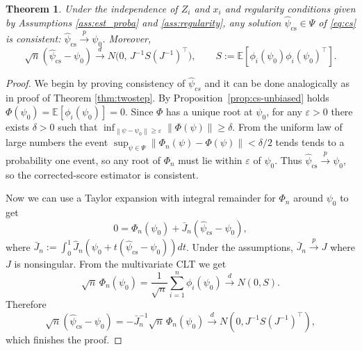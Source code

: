 \documentclass[11pt]{article}
\newtheorem{theorem}{Theorem}
\theoremstyle{definition}
\theoremstyle{remark}
\newcommand{\E}{\mathbb{E}}
\newcommand{\toP}{\xrightarrow{\,p\,}}
\newcommand{\tod}{\xrightarrow{\,d\,}}
\newcommand{\norm}[1]{\left\lVert #1 \right\rVert}
\begin{document}
\begin{theorem}\label{thm:cs}
Under the independence of $Z_i$ and $x_i$ and regularity conditions given by Assumptions  \ref{ass:est_proba} and \ref{ass:regularity}, any solution $\hat\psi_{\mathrm{cs}}\in \Psi$ of \eqref{eq:cs} is consistent: $\hat\psi_{\mathrm{cs}}\toP\psi_0$. Moreover,
\[
\sqrt{n}(\hat\psi_{\mathrm{cs}}-\psi_0)\tod N\big(0,\,J^{-1}S(J^{-1})^\top\big),\qquad S:=\E[\phi_i(\psi_0)\phi_i(\psi_0)^\top].
\]
\end{theorem}

\begin{proof}
We begin by proving consistency of $\hat\psi_{cs}$ and it can be done analogically as in proof of Theorem \ref{thm:twostep}. By Proposition~\ref{prop:cs-unbiased} holds $\Phi(\psi_0)=\E[\phi_i(\psi_0)]=0$. Since $\Phi$ has a unique root at $\psi_0$, for any $\varepsilon>0$ there exists $\delta>0$ such that $\inf_{\norm{\psi-\psi_0}\ge\varepsilon}\norm{\Phi(\psi)}\ge\delta$. From the uniform law of large numbers the event $\sup_{\psi\in\Psi}\norm{\Phi_n(\psi)-\Phi(\psi)}<\delta/2$ tends tends to a probability one event, so any root of $\Phi_n$ must lie within $\varepsilon$ of $\psi_0$.
Thus $\hat\psi_{\mathrm{cs}}\toP\psi_0$, so the corrected-score estimator is consistent.

Now we can use a Taylor expansion with integral remainder for $\Phi_n$ around $\psi_0$ to get
\[0=\Phi_n(\psi_0)+\bar J_n(\hat\psi_{\mathrm{cs}}-\psi_0),\]
where $\bar J_n :=\int_0^1\hat J_n (\psi_0 +t(\hat\psi_{\mathrm{cs}}-\psi_0))dt$.
Under the assumptions, $\bar J_n\toP J$ where $J$ is nonsingular.
From the multivariate CLT we get
\[\sqrt{n}\,\Phi_n(\psi_0)=\frac{1}{\sqrt{n}}\sum_{i=1}^n\phi_i(\psi_0)\tod N(0,S).\]
Therefore
\[\sqrt{n}(\hat\psi_{\mathrm{cs}}-\psi_0)= -\bar J_n^{-1}\sqrt{n}\,\Phi_n(\psi_0)\tod N(0,J^{-1}S(J^{-1})^\top),\]
which finishes the proof.
\end{proof}
\end{document}
